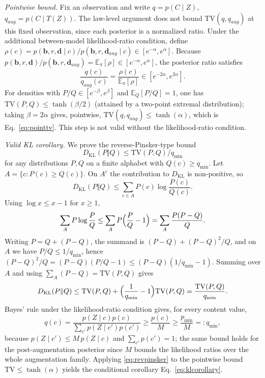 \documentclass[electronics,article,submit,moreauthors]{Definitions/mdpi}
\newcommand{\add}[1]{\textcolor{addblue}{#1}}
\newcommand{\del}[1]{\textcolor{delred}{\st{#1}}}
\def\add#1{#1}
\def\del#1{}
\begin{document}
\add{\emph{Pointwise bound.} Fix an observation and write $q=p(C\mid Z)$, $q_{aug}=p(C\mid T(Z))$. The law-level argument does not bound $\mathrm{TV}(q,q_{aug})$ at this fixed observation, since each posterior is a normalized ratio. Under the additional between-model likelihood-ratio condition, define $\rho(c)=p(\mathbf b,r,\mathbf d\mid c)/p(\mathbf b,r,\mathbf d_{aug}\mid c)\in[e^{-\alpha},e^{\alpha}]$. Because $p(\mathbf b,r,\mathbf d)/p(\mathbf b,r,\mathbf d_{aug})=\mathbb E_\pi[\rho]\in[e^{-\alpha},e^{\alpha}]$, the posterior ratio satisfies}
\begin{equation}
\add{\frac{q(c)}{q_{aug}(c)}=\frac{\rho(c)}{\mathbb E_\pi[\rho]}\in[e^{-2\alpha},e^{2\alpha}].}
\end{equation}
\add{For densities with $P/Q\in[e^{-\beta},e^{\beta}]$ and $\mathbb E_Q[P/Q]=1$, one has $\mathrm{TV}(P,Q)\le\tanh(\beta/2)$ (attained by a two-point extremal distribution); taking $\beta=2\alpha$ gives, pointwise, $\mathrm{TV}(q,q_{aug})\le\tanh(\alpha)$, which is Eq.~\eqref{eq:pointtv}. This step is not valid without the likelihood-ratio condition.}

\emph{Valid KL corollary.} We prove the reverse-Pinsker-type bound
\begin{equation*}
D_{\mathrm{KL}}(P\Vert Q)\le \mathrm{TV}(P,Q)/q_{\min}
\end{equation*}
for any distributions $P,Q$ on a finite alphabet with $Q(c)\ge q_{\min}$. Let $A=\{c:P(c)\ge Q(c)\}$. On $A^c$ the contribution to $D_{\mathrm{KL}}$ is non-positive, so
\begin{equation*}
D_{\mathrm{KL}}(P\Vert Q)\le\sum_{c\in A}P(c)\log\frac{P(c)}{Q(c)}.
\end{equation*}
Using $\log x\le x-1$ for $x\ge1$,
\begin{equation*}
\sum_{A}P\log\frac{P}{Q}\le\sum_{A}P\Bigl(\frac{P}{Q}-1\Bigr)=\sum_{A}\frac{P(P-Q)}{Q}.
\end{equation*}
Writing $P=Q+(P-Q)$, the summand is $(P-Q)+(P-Q)^2/Q$, and on $A$ we have $P/Q\le 1/q_{\min}$, hence $(P-Q)^2/Q=(P-Q)(P/Q-1)\le(P-Q)(1/q_{\min}-1)$. Summing over $A$ and using $\sum_A(P-Q)=\mathrm{TV}(P,Q)$ gives
\begin{equation}
D_{\mathrm{KL}}(P\Vert Q)\le\mathrm{TV}(P,Q)+\Bigl(\frac{1}{q_{\min}}-1\Bigr)\mathrm{TV}(P,Q)=\frac{\mathrm{TV}(P,Q)}{q_{\min}}.
\label{eq:revpinsker}
\end{equation}
Bayes' rule under the likelihood-ratio condition gives, for every content value,
\begin{equation}
q(c)=\frac{p(Z\mid c)p(c)}{\sum_{c'}p(Z\mid c')p(c')}\ge \frac{p(c)}{M}\ge \frac{p_{\min}}{M}=:q_{\min},
\end{equation}
because $p(Z\mid c')\le M\,p(Z\mid c)$ and $\sum_{c'}p(c')=1$; the same bound holds for the post-augmentation posterior since $M$ bounds the likelihood ratios over the whole augmentation family. \del{Applying \mbox{\eqref{eq:revpinsker}} with \mbox{$\mathrm{TV}\le\tau$} yields Eq.~\mbox{\eqref{eq:klcorollary}}.}
\add{Applying \eqref{eq:revpinsker} to the pointwise bound $\mathrm{TV}\le\tanh(\alpha)$ yields the conditional corollary Eq.~\eqref{eq:klcorollary}.}
\end{document}
